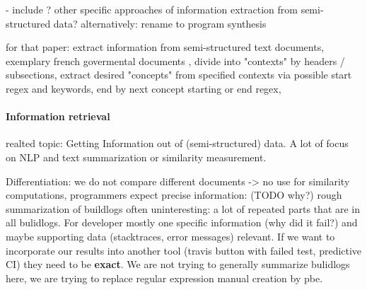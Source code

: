 \documentclass[\myrootdir/main.tex]{subfiles}
\begin{document}
- include \cite{smith1997information}? other specific approaches of information extraction from semi-structured data? alternatively: rename to program synthesis

for that paper: extract information from semi-structured text documents, exemplary french govermental documents , divide into "contexts" by headers / subsections, extract desired "concepts" from specified contexts via possible start regex and keywords, end by next concept starting or end regex, 

\paragraph{Information retrieval}
realted topic: Getting Information out of (semi-structured) data. A lot of focus on NLP and text summarization or similarity measurement.

Differentiation: we do not compare different documents -> no use for similarity computations, programmers expect precise information: (TODO why?) rough summarization of buildlogs often uninteresting: a lot of repeated parts that are in all bulidlogs. For developer mostly one specific information (why did it fail?) and maybe supporting data (stacktraces, error messages) relevant. If we want to incorporate our results into another tool (travis button with failed test, predictive CI) they need to be \textbf{exact}. We are not trying to generally summarize bulidlogs here, we are trying to replace regular expression manual creation by pbe.
\end{document}
